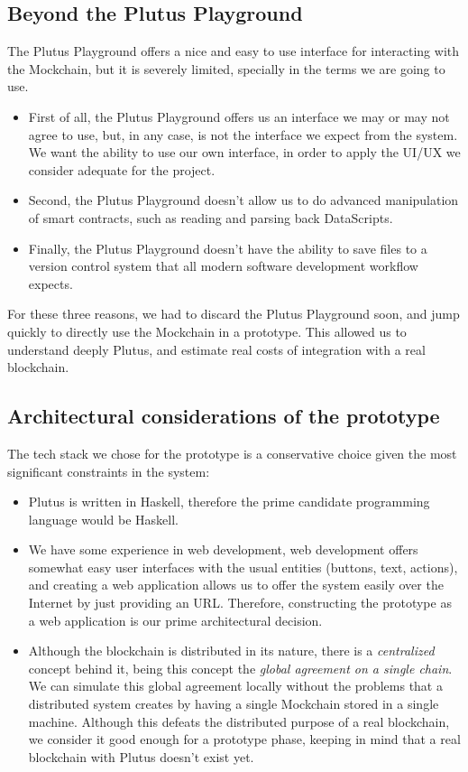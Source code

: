 \documentclass{article}
\begin{document}
\subsection{Beyond the Plutus Playground}
The Plutus Playground offers a nice and easy to use interface for interacting with the Mockchain, but it is severely limited, specially in the terms we are going to use.

\begin{itemize}
  \item First of all, the Plutus Playground offers us an interface we may or may not agree to use, but, in any case, is not the interface we expect from the system. We want the ability to use our own interface, in order to apply the UI/UX we consider adequate for the project.
  \item Second, the Plutus Playground doesn't allow us to do advanced manipulation of smart contracts, such as reading and parsing back DataScripts.
  \item Finally, the Plutus Playground doesn't have the ability to save files to a version control system that all modern software development workflow expects.
\end{itemize}

For these three reasons, we had to discard the Plutus Playground soon, and jump quickly to directly use the Mockchain in a prototype. This allowed us to understand deeply Plutus, and estimate real costs of integration with a real blockchain.

\subsection{Architectural considerations of the prototype}
The tech stack we chose for the prototype is a conservative choice given the most significant constraints in the system:

\begin{itemize}
  \item Plutus is written in Haskell, therefore the prime candidate programming language would be Haskell.
  \item We have some experience in web development, web development offers somewhat easy user interfaces with the usual entities (buttons, text, actions), and creating a web application allows us to offer the system easily over the Internet by just providing an URL. Therefore, constructing the prototype as a web application is our prime architectural decision.
  \item Although the blockchain is distributed in its nature, there is a \emph{centralized} concept behind it, being this concept the \emph{global agreement on a single chain}. We can simulate this global agreement locally without the problems that a distributed system creates by having a single Mockchain stored in a single machine. Although this defeats the distributed purpose of a real blockchain, we consider it good enough for a prototype phase, keeping in mind that a real blockchain with Plutus doesn't exist yet.
\end{itemize}
\end{document}
